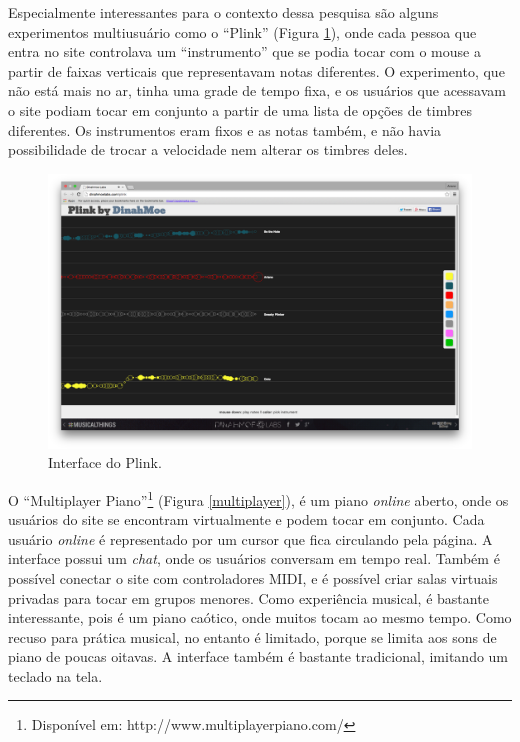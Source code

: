 {Especialmente interessantes para o contexto dessa pesquisa são alguns experimentos multiusuário como o ``Plink'' (Figura \ref{plink}), onde cada pessoa que entra no site controlava um ``instrumento'' que se podia tocar com o mouse a partir de faixas verticais que representavam notas diferentes. O experimento, que não está mais no ar, tinha uma grade de tempo fixa, e os usuários que acessavam o site podiam tocar em conjunto a partir de uma lista de opções de timbres diferentes. Os instrumentos eram fixos e as notas também, e não havia possibilidade de trocar a velocidade nem alterar os timbres deles. 

\begin{figure}
    \caption{\label{plink}Interface do Plink.}
    
        \includegraphics[width=1\linewidth]{pictures/cap2/plink}
    
\end{figure}

O ``Multiplayer Piano''\footnote{Disponível em: http://www.multiplayerpiano.com/} (Figura \ref{multiplayer}), é um piano \emph{online} aberto, onde os usuários do site se encontram virtualmente e podem tocar em conjunto. Cada usuário \emph{online} é representado por um cursor que fica circulando pela página. A interface possui um \emph{chat}, onde os usuários conversam em tempo real. Também é possível conectar o site com controladores MIDI, e é possível criar salas virtuais privadas para tocar em grupos menores. Como experiência musical, é bastante interessante, pois é um piano caótico, onde muitos tocam ao mesmo tempo. Como recuso para prática musical, no entanto é limitado, porque se limita aos sons de piano de poucas oitavas. A interface também é bastante tradicional, imitando um teclado na tela.


}
